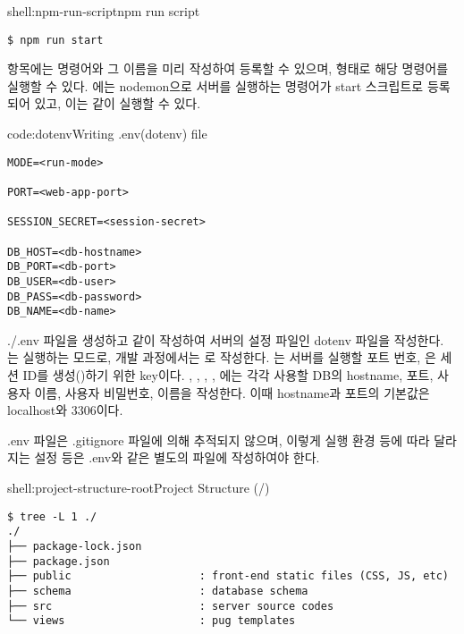 \begin{shell}{shell:npm-run-script}{npm run script}
\begin{verbatim}
$ npm run start
\end{verbatim}
\end{shell}

 항목에는 명령어와 그 이름을 미리 작성하여 등록할 수 있으며,  형태로 해당 명령어를 실행할 수 있다. 에는 nodemon으로 서버를 실행하는 명령어가 start 스크립트로 등록되어 있고, 이는 \와 같이 실행할 수 있다.

\begin{code}{code:dotenv}{Writing .env(dotenv) file}
\begin{verbatim}
MODE=<run-mode>

PORT=<web-app-port>

SESSION_SECRET=<session-secret>

DB_HOST=<db-hostname>
DB_PORT=<db-port>
DB_USER=<db-user>
DB_PASS=<db-password>
DB_NAME=<db-name>
\end{verbatim}
\end{code}

./.env 파일을 생성하고 \와 같이 작성하여 서버의 설정 파일인 dotenv 파일을 작성한다. 는 실행하는 모드로, 개발 과정에서는 로 작성한다. 는 서버를 실행할 포트 번호, 은 세션 ID를 생성()하기 위한 key이다. , , , , 에는 각각 사용할 DB의 hostname, 포트, 사용자 이름, 사용자 비밀번호, 이름을 작성한다. 이때 hostname과 포트의 기본값은 localhost와 3306이다.

.env 파일은 .gitignore 파일에 의해 추적되지 않으며, 이렇게 실행 환경 등에 따라 달라지는 설정 등은 .env와 같은 별도의 파일에 작성하여야 한다.

\begin{shell}{shell:project-structure-root}{Project Structure (/)}
\begin{verbatim}
$ tree -L 1 ./
./
├── package-lock.json
├── package.json
├── public                    : front-end static files (CSS, JS, etc)
├── schema                    : database schema
├── src                       : server source codes
└── views                     : pug templates
\end{verbatim}
\end{shell}

